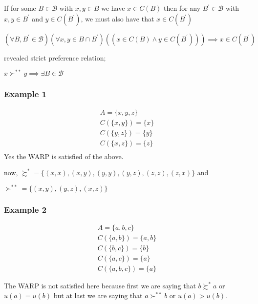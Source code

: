 \documentclass[12pt,a4paper,fleqn]{article}
\begin{document}
If for some \(B \in \mathcal{B}\) with \(x,y \in B\) we have \(x \in C(B)\) then for any \( B^\prime \in \mathcal{B}\) with \(x,y \in B^\prime \) and \(y \in C(B^\prime)\), we must also have that \(x \in C(B^\prime)\)             

\(\left( \forall B, B^\prime \in \mathcal{B} \right)\left( \forall x,y \in B \cap B^\prime  \right)\left( \left( x \in C(B) \wedge y \in C(B^\prime) \right)  \right) \implies x \in C(B^\prime) \)   

revealed strict preference relation;

\(x \succ^{**} y  \implies \exists B \in \mathcal{B} \)  

 \subsubsection*{Example 1} 
 \begin{align*}
    A= \{x,y,z\} \\
    C(\{x,y\})=\{x\} \\
    C(\{y,z\})=\{y\} \\
    C(\{x,z\})=\{z\} \\ 
\end{align*}
Yes the WARP is satisfied of the above.

now, \(\succsim^* =\{(x,x),(x,y),(y,y),(y,z),(z,z),(z,x)\} \)  and

\(\succ^{**} = \{(x,y),(y,z),(x,z)\} \)  

 \subsubsection*{Example 2} 

 \begin{align*}
  A= \{a,b,c\} \\
  C(\{a,b\})=\{a,b\} \\
  C(\{b,c\})=\{b\} \\
  C(\{a,c\})=\{a\} \\ 
  C(\{a,b,c\})=\{a\}
\end{align*}

The WARP is not satisfied here because first we are saying that \(b \succsim^* a\) or \(u(a)=u(b)\)  but at last we are saying that \(a \succ^{**} b\) or \(u(a) > u(b)\).
\end{document}
